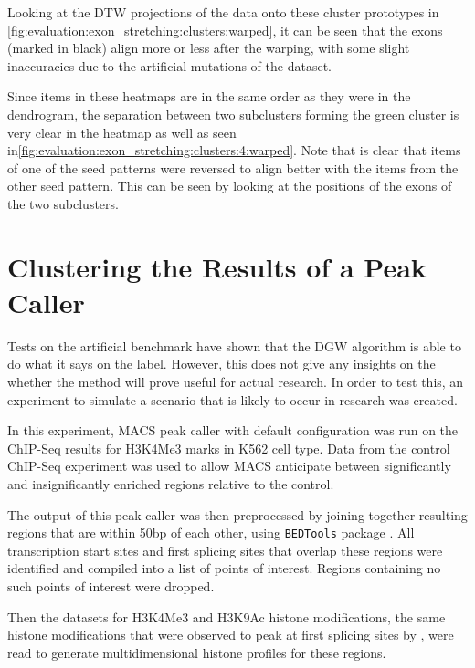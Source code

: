 \documentclass[parskip]{cs4rep}
\newcommand{\histonemodification}[1]{#1}
\newcommand{\celltype}[1]{#1}
\begin{document}
Looking at the DTW projections of the data onto these cluster prototypes in \autoref{fig:evaluation:exon_stretching:clusters:warped}, it can be seen that the exons (marked in black) align more or less after the warping, with some slight inaccuracies due to the artificial mutations of the dataset. 

Since items in these heatmaps are in the same order as they were in the dendrogram, the separation between two subclusters forming the green cluster is very clear in the heatmap as well as seen in\autoref{fig:evaluation:exon_stretching:clusters:4:warped}. Note that is clear that items of one of the seed patterns were reversed to align better with the items from the other seed pattern. This can be seen by looking at the positions of the exons of the two subclusters.

\section{Clustering the Results of a Peak Caller}
\label{sec:macs-experiment}
Tests on the artificial benchmark have shown that the DGW algorithm is able to do what it says on the label. However, this does not give any insights on the whether the method will prove useful for actual research. In order to test this, an experiment to simulate a scenario that is likely to occur in research was created.

In this experiment, MACS peak caller with default configuration \cite{Zhang:2008wp} was run on the ChIP-Seq results for \histonemodification{H3K4Me3} marks in \celltype{K562} cell type. Data from the control ChIP-Seq experiment was used to allow MACS anticipate between significantly and insignificantly enriched regions relative to the control.

The output of this peak caller was then preprocessed by joining together resulting regions that are within 50bp of each other, using {\tt BEDTools} package \cite{Quinlan:2010ur}. 
All transcription start sites and first splicing sites that overlap these regions were identified and compiled into a list of points of interest. Regions containing no such points of interest were dropped.

Then the datasets for \histonemodification{H3K4Me3} and \histonemodification{H3K9Ac} histone modifications, the same histone modifications that were observed to peak at first splicing sites by \cite{Bieberstein:2012tf}, were read to generate multidimensional histone profiles for these regions.
\end{document}
